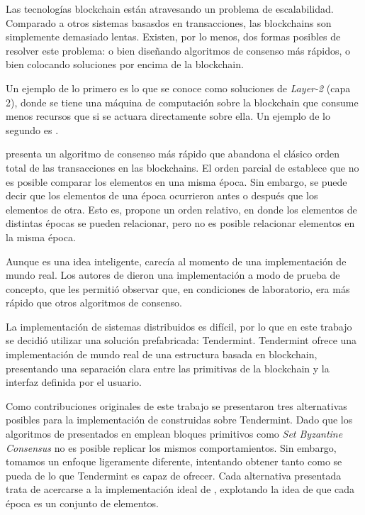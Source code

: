 %
Las tecnologías blockchain están atravesando un problema de escalabilidad.
%
Comparado a otros sistemas basasdos en transacciones, las blockchains son simplemente
demasiado lentas.
%
Existen, por lo menos, dos formas posibles de resolver este problema: o bien
diseñando algoritmos de consenso más rápidos, o bien colocando soluciones por
encima de la blockchain.

%
Un ejemplo de lo primero es lo que se conoce como soluciones de \emph{Layer-2}
(capa 2),
donde se tiene una máquina de computación sobre la blockchain que consume menos
recursos que si se actuara directamente sobre ella.
%
Un ejemplo de lo segundo es \setchain.

\setchain presenta un algoritmo de consenso más rápido
que abandona el clásico orden total de las transacciones en las blockchains.
%
El orden parcial de \setchain establece que no es posible comparar los elementos
en una misma época.
%
Sin embargo, se puede decir que los elementos de una época ocurrieron antes o después
que los elementos de otra.
%
Esto es, \setchain propone un orden relativo, en donde los elementos
de distintas épocas se pueden relacionar, pero no es posible relacionar elementos
en la misma época.

Aunque \setchain es una idea inteligente, carecía al momento de una implementación
de mundo real.
%
Los autores de \setchain dieron una implementación a modo de prueba de concepto,
que les permitió observar que, en condiciones de laboratorio,
era más rápido que otros algoritmos de consenso.
%

La implementación de sistemas distribuidos es difícil, por lo que en este trabajo
se decidió utilizar una solución prefabricada: Tendermint.
Tendermint ofrece una implementación
de mundo real de una estructura basada en blockchain, presentando una separación clara
entre las primitivas de la blockchain y la interfaz definida por el usuario.


Como contribuciones originales de este trabajo se presentaron tres alternativas posibles para la implementación
de \setchain construidas sobre Tendermint. Dado que los algoritmos de \setchain
presentados en \cite{Capretto.2022.Setchain} emplean bloques primitivos como
\emph{Set Byzantine Consensus}
no es posible replicar los mismos comportamientos.
Sin embargo, tomamos un enfoque ligeramente diferente,
intentando obtener tanto como se pueda de lo que Tendermint es capaz de ofrecer.
Cada alternativa presentada trata de acercarse a la implementación ideal de \setchain,
explotando la idea de que cada época es un conjunto de elementos.

